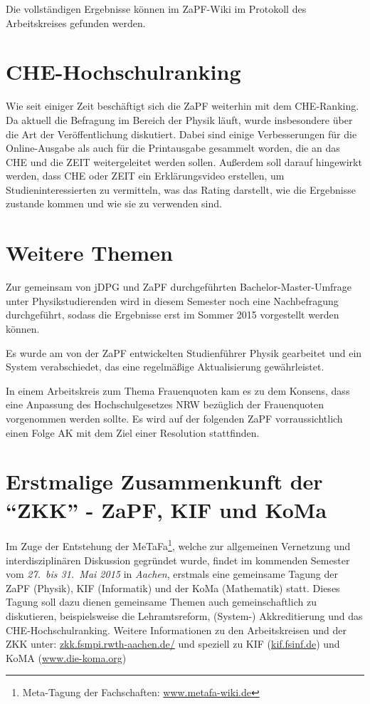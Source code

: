 \documentclass{scrartcl}
\begin{document}
Die vollständigen Ergebnisse können im ZaPF-Wiki im Protokoll des Arbeitskreises gefunden werden.

\section*{CHE-Hochschulranking}
Wie seit einiger Zeit beschäftigt sich die ZaPF weiterhin mit dem CHE-Ranking. Da aktuell die Befragung im Bereich der Physik läuft, wurde insbesondere über die Art der Veröffentlichung diskutiert. Dabei sind einige  Verbesserungen für die Online-Ausgabe als auch  für die  Printausgabe gesammelt worden, die an das CHE und die ZEIT weitergeleitet werden sollen. Außerdem soll darauf hingewirkt werden, dass CHE oder ZEIT ein Erklärungsvideo erstellen, um Studieninteressierten zu vermitteln, was das Rating darstellt, wie die Ergebnisse zustande kommen und wie sie zu verwenden sind.

\section*{Weitere Themen}

Zur gemeinsam von jDPG und ZaPF durchgeführten Bachelor-Master-Umfrage unter Physikstudierenden wird in diesem Semester noch eine Nachbefragung durchgeführt, sodass die Ergebnisse erst im Sommer 2015 vorgestellt werden können.

Es wurde am von der ZaPF entwickelten Studienführer Physik gearbeitet und ein System verabschiedet, das eine regelmäßige Aktualisierung gewährleistet.

In einem Arbeitskreis zum Thema Frauenquoten kam es zu dem Konsens, dass eine Anpassung des Hochschulgesetzes NRW bezüglich der Frauenquoten vorgenommen werden sollte. Es wird auf der folgenden ZaPF vorraussichtlich einen Folge AK mit dem Ziel einer Resolution stattfinden.


\section*{Erstmalige Zusammenkunft der ``ZKK'' - ZaPF, KIF und KoMa}
Im Zuge der Entstehung der MeTaFa\footnote{Meta-Tagung der Fachschaften: \href{http://metafa-wiki.de}{\url{www.metafa-wiki.de}}}, welche zur allgemeinen  Vernetzung und interdisziplinären Diskussion gegründet wurde, findet im kommenden Semester  vom \emph{27.\ bis 31.\ Mai 2015} in \emph{Aachen}, erstmals eine gemeinsame Tagung der  ZaPF (Physik), KIF (Informatik) und der KoMa (Mathematik) statt. Dieses Tagung soll dazu dienen gemeinsame Themen auch gemeinschaftlich zu diskutieren, beispielsweise die Lehramtsreform, (System-) Akkreditierung und das CHE-Hochschulranking. 
Weitere Informationen zu den Arbeitskreisen und der ZKK unter: \href{zkk.fsmpi.rwth-aachen.de/}{\url{zkk.fsmpi.rwth-aachen.de/}} und speziell zu KIF (\href{https://kif.fsinf.de}{\url{kif.fsinf.de}}) und KoMA (\href{http://www.die-koma.org/}{\url{www.die-koma.org}})
\end{document}
